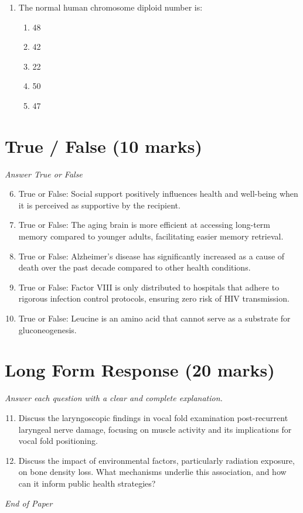 \documentclass[12pt]{article}
\begin{document}
\begin{enumerate}[label=\arabic*.]
\begin{enumerate}[label=(\alph*)]
    \item 72
    \item 88
    \item 82
    \item 78
    \item 80
\end{enumerate}
\item The normal human chromosome diploid number is:
\begin{enumerate}[label=(\alph*)]
    \item 48
    \item 42
    \item 22
    \item 50
    \item 47
\end{enumerate}
\end{enumerate}

\section*{True / False (10 marks)}
\textit{Answer True or False}
\begin{enumerate}[label=\arabic*.]
\setcounter{enumi}{5}
\item True or False: Social support positively influences health and well-being when it is perceived as supportive by the recipient.
\item True or False: The aging brain is more efficient at accessing long-term memory compared to younger adults, facilitating easier memory retrieval.
\item True or False: Alzheimer's disease has significantly increased as a cause of death over the past decade compared to other health conditions.
\item True or False: Factor VIII is only distributed to hospitals that adhere to rigorous infection control protocols, ensuring zero risk of HIV transmission.
\item True or False: Leucine is an amino acid that cannot serve as a substrate for gluconeogenesis.
\end{enumerate}

\section*{Long Form Response (20 marks)}
\textit{Answer each question with a clear and complete explanation.}
\begin{enumerate}[label=\arabic*.]
\setcounter{enumi}{10}
\item Discuss the laryngoscopic findings in vocal fold examination post-recurrent laryngeal nerve damage, focusing on muscle activity and its implications for vocal fold positioning.
\item Discuss the impact of environmental factors, particularly radiation exposure, on bone density loss. What mechanisms underlie this association, and how can it inform public health strategies?
\end{enumerate}

\vfill
\noindent\textit{End of Paper}
\end{document}

